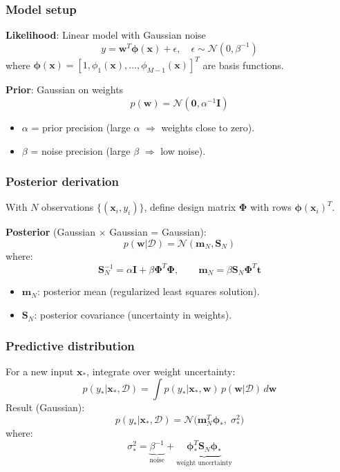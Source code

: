 \documentclass{beamer}
\begin{document}
\begin{frame}
\frametitle{Model setup}
\textbf{Likelihood}: Linear model with Gaussian noise
\[
y = \mathbf{w}^T \boldsymbol{\phi}(\mathbf{x}) + \epsilon, \quad \epsilon \sim \mathcal{N}(0, \beta^{-1})
\]
where $\boldsymbol{\phi}(\mathbf{x}) = [1, \phi_1(\mathbf{x}), \ldots, \phi_{M-1}(\mathbf{x})]^T$ are basis functions.

\vspace{0.3cm}
\textbf{Prior}: Gaussian on weights
\[
p(\mathbf{w}) = \mathcal{N}(\mathbf{0}, \alpha^{-1}\mathbf{I})
\]
\begin{itemize}
    \item $\alpha$ = prior precision (large $\alpha$ $\Rightarrow$ weights close to zero).
    \item $\beta$ = noise precision (large $\beta$ $\Rightarrow$ low noise).
\end{itemize}
\end{frame}

\begin{frame}
\frametitle{Posterior derivation}
With $N$ observations $\{(\mathbf{x}_i, y_i)\}$, define design matrix $\boldsymbol{\Phi}$ with rows $\boldsymbol{\phi}(\mathbf{x}_i)^T$.

\vspace{0.2cm}
\textbf{Posterior} (Gaussian $\times$ Gaussian = Gaussian):
\[
p(\mathbf{w}|\mathcal{D}) = \mathcal{N}(\mathbf{m}_N, \mathbf{S}_N)
\]
where:
\[
\mathbf{S}_N^{-1} = \alpha\mathbf{I} + \beta\boldsymbol{\Phi}^T\boldsymbol{\Phi}, \qquad \mathbf{m}_N = \beta\mathbf{S}_N\boldsymbol{\Phi}^T\mathbf{t}
\]

\vspace{0.2cm}
\begin{itemize}
    \item $\mathbf{m}_N$: posterior mean (regularized least squares solution).
    \item $\mathbf{S}_N$: posterior covariance (uncertainty in weights).
\end{itemize}
\end{frame}

\begin{frame}
\frametitle{Predictive distribution}
For a new input $\mathbf{x}_*$, integrate over weight uncertainty:
\[
p(y_*|\mathbf{x}_*, \mathcal{D}) = \int p(y_*|\mathbf{x}_*, \mathbf{w}) \, p(\mathbf{w}|\mathcal{D}) \, d\mathbf{w}
\]
\vspace{0.2cm}
Result (Gaussian):
\[
p(y_*|\mathbf{x}_*, \mathcal{D}) = \mathcal{N}\bigl(\mathbf{m}_N^T\boldsymbol{\phi}_*, \; \sigma_*^2\bigr)
\]
where:
\[
\sigma_*^2 = \underbrace{\beta^{-1}}_{\text{noise}} + \underbrace{\boldsymbol{\phi}_*^T \mathbf{S}_N \boldsymbol{\phi}_*}_{\text{weight uncertainty}}
\]
\end{frame}
\end{document}
